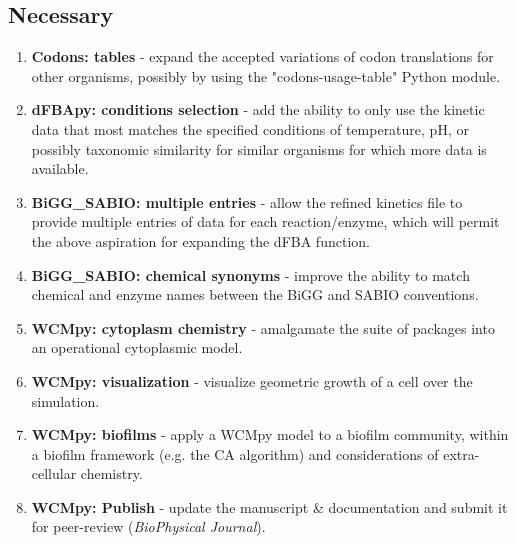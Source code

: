 \subsection{Necessary}
\begin{enumerate}
    \item \textbf{Codons: tables} - expand the accepted variations of codon translations for other organisms, possibly by using the "codons-usage-table" Python module.
    \item \textbf{dFBApy: conditions selection} - add the ability to only use the kinetic data that most matches the specified conditions of temperature, pH, or possibly taxonomic similarity for similar organisms for which more data is available.
    \item \textbf{BiGG\_SABIO: multiple entries} - allow the refined kinetics file to provide multiple entries of data for each reaction/enzyme, which will permit the above aspiration for expanding the dFBA function.
    \item \textbf{BiGG\_SABIO: chemical synonyms} - improve the ability to match chemical and enzyme names between the BiGG and SABIO conventions.
    \item \textbf{WCMpy: cytoplasm chemistry} - amalgamate the suite of packages into an operational cytoplasmic model.
    \item \textbf{WCMpy: visualization} - visualize geometric growth of a cell over the simulation.
    \item \textbf{WCMpy: biofilms} - apply a WCMpy model to a biofilm community, within a biofilm framework (e.g. the CA algorithm) and considerations of extra-cellular chemistry.
    \item \textbf{WCMpy: Publish} - update the manuscript \& documentation and submit it for peer-review (\textit{BioPhysical Journal}).
\end{enumerate}

